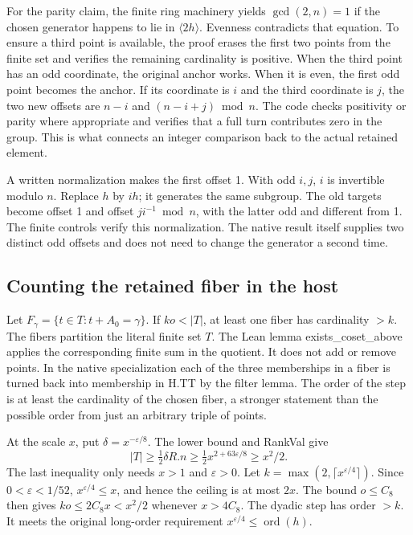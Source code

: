 \documentclass[12pt,letterpaper]{article}
\DeclareRobustCommand{\id}[1]{\mbox{\small\ttfamily #1}}
\begin{document}
For the parity claim, the finite ring machinery yields \(\gcd(2,n)=1\) if the chosen generator happens to lie in \(\langle2h\rangle\). Evenness contradicts that equation. To ensure a third point is available, the proof erases the first two points from the finite set and verifies the remaining cardinality is positive. When the third point has an odd coordinate, the original anchor works. When it is even, the first odd point becomes the anchor. If its coordinate is \(i\) and the third coordinate is \(j\), the two new offsets are \(n-i\) and \((n-i+j)\bmod n\). The code checks positivity or parity where appropriate and verifies that a full turn contributes zero in the group. This is what connects an integer comparison back to the actual retained element.

A written normalization makes the first offset 1. With odd \(i,j\), \(i\) is invertible modulo \(n\). Replace \(h\) by \(ih\); it generates the same subgroup. The old targets become offset 1 and offset \(ji^{-1}\bmod n\), with the latter odd and different from 1. The finite controls verify this normalization. The native result itself supplies two distinct odd offsets and does not need to change the generator a second time.

\subsection{Counting the retained fiber in the host}

Let \(F_\gamma=\{t\in T:t+A_0=\gamma\}\). If \(ko<|T|\), at least one fiber has cardinality \(>k\). The fibers partition the literal finite set \(T\). The Lean lemma \id{exists\_coset\_above} applies the corresponding finite sum in the quotient. It does not add or remove points. In the native specialization each of the three memberships in a fiber is turned back into membership in \id{H.TT} by the filter lemma. The order of the step is at least the cardinality of the chosen fiber, a stronger statement than the possible order from just an arbitrary triple of points.

At the scale \(x\), put \(\delta=x^{-\varepsilon/8}\). The lower bound and \id{RankVal} give
\begin{equation}
 |T|\ge\tfrac12\delta R.n\ge\tfrac12 x^{2+63\varepsilon/8}\ge x^2/2.
 \label{eq:host-density}
\end{equation}
The last inequality only needs \(x>1\) and \(\varepsilon>0\). Let \(k=\max(2,\lceil x^{\varepsilon/4}\rceil)\). Since \(0<\varepsilon<1/52\), \(x^{\varepsilon/4}\le x\), and hence the ceiling is at most \(2x\). The bound \(o\le C_8\) then gives \(ko\le 2 C_8 x <x^2/2\) whenever \(x>4 C_8\). The dyadic step has order \(>k\). It meets the original long-order requirement \(x^{\varepsilon/4}\le\operatorname{ord}(h)\).
\end{document}
